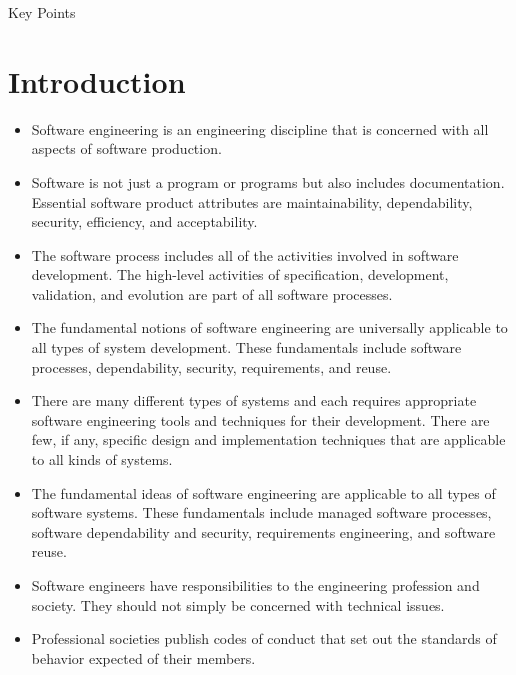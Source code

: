 \documentclass{article}
\begin{document}
\begin{center}
    Key Points
\end{center}
\section{Introduction}
\begin{itemize}
    \item Software engineering is an engineering discipline that is concerned with all aspects of software production.
    \item Software is not just a program or programs but also includes documentation.
        Essential software product attributes are maintainability, dependability, security, efficiency, and acceptability.
    \item The software process includes all of the activities involved in software development.
        The high-level activities of specification, development, validation, and evolution are part of all software processes.
    \item The fundamental notions of software engineering are universally applicable to all types of system development.
        These fundamentals include software processes, dependability, security, requirements, and reuse.
    \item There are many different types of systems and each requires appropriate software engineering tools and techniques for their development.
        There are few, if any, specific design and implementation techniques that are applicable to all kinds of systems.
    \item The fundamental ideas of software engineering are applicable to all types of software systems.
        These fundamentals include managed software processes, software dependability and security, requirements engineering, and software reuse.
    \item Software engineers have responsibilities to the engineering profession and society.  They should not simply be concerned with technical issues.
    \item Professional societies publish codes of conduct that set out the standards of behavior expected of their members.
\end{itemize}
\end{document}
